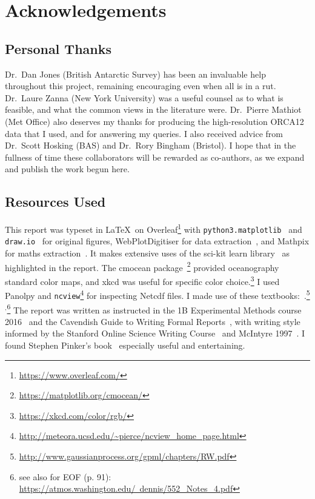 \documentclass[../main.tex]{subfiles}
\begin{document}
\section{Acknowledgements}
\subsection{Personal Thanks}
Dr.\ Dan Jones (British Antarctic Survey) has been an invaluable help throughout this project,
remaining encouraging even when all is in a rut.
Dr.\ Laure Zanna (New York University) was a useful counsel as to what is feasible,
 and what the common views in the literature were.
Dr.\ Pierre Mathiot (Met Office) also deserves my thanks for
producing the high-resolution ORCA12 data that I used, and
for answering my queries.
I also received advice from Dr.\ Scott Hosking (BAS) and  Dr.\ Rory Bingham (Bristol).
I hope that in the fullness of time these collaborators will be rewarded
as co-authors, as we expand and publish the
work begun here.


\subsection{Resources Used}

This report was typeset in \LaTeX\  on Overleaf\footnote{\href{https://www.overleaf.com/}{https://www.overleaf.com/}}
 with \texttt{python3.matplotlib}~\cite{Hunter:2007} and \texttt{draw.io}~\cite{DrawIO}
  for original figures, WebPlotDigitiser for data extraction~\cite{WebPlotDigitiser},
   and Mathpix for maths extraction~\cite{mathpix}.
    It makes extensive uses of the sci-kit learn library~\cite{scikit-learn} as highlighted in the report.
     The cmocean package~\cite{thyng2016true}\footnote{\href{https://matplotlib.org/cmocean/}{https://matplotlib.org/cmocean/}}
     provided oceanography standard color maps, and xkcd was useful for specific color choice.\footnote{\href{https://xkcd.com/color/rgb/}{https://xkcd.com/color/rgb/}}
     I used Panolpy and \texttt{ncview}\footnote{\url{http://meteora.ucsd.edu/~pierce/ncview_home_page.html}} for inspecting Netcdf files.
      I made use of these textbooks:~\cite{roisin2010GFD,williams2011ocean,ITILA, sivia2006data,landau1959course,faber1995fluid,williams2006gaussian,murphy2012machine}.\footnote{\href{http://www.gaussianprocess.org/gpml/chapters/RW.pdf}{http://www.gaussianprocess.org/gpml/chapters/RW.pdf}}$^{,}$\footnote{see also for EOF (p. 91): \href{https://atmos.washington.edu/~dennis/552_Notes_4.pdf}{https://atmos.washington.edu/~dennis/552\_Notes\_4.pdf}}
     The report was written as instructed in the 1B Experimental Methods course 2016~\cite{presentation} and the Cavendish Guide to Writing Formal Reports~\cite{LabNotes}, with writing style informed by the Stanford Online Science Writing Course~\cite{ScienceWriting} and McIntyre 1997~\cite{mcintyre1997lucidity}. I found Stephen Pinker's book~\cite{pinker2015sense} especially useful and entertaining.
\end{document}
